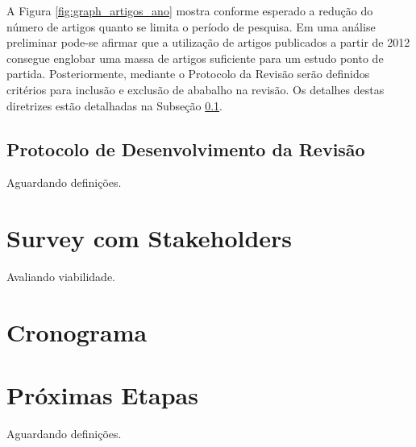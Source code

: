 \documentclass{article}
\begin{document}
A Figura \ref{fig:graph_artigos_ano} mostra conforme esperado a
redução do número de artigos quanto se limita o período de
pesquisa. Em uma análise preliminar pode-se afirmar que a utilização
de artigos publicados a partir de 2012 consegue englobar uma massa de
artigos suficiente para um estudo ponto de partida. Posteriormente,
mediante o Protocolo da Revisão serão definidos critérios para
inclusão e exclusão de ababalho na revisão. Os detalhes destas
diretrizes estão detalhadas na Subseção \ref{subsec:protocol}.



\subsection{Protocolo de Desenvolvimento da Revisão}
\label{subsec:protocol}

Aguardando definições.

\section{Survey com Stakeholders}
\label{sec:survey}

Avaliando viabilidade.

\section{Cronograma}
\label{sec:cronograma}


\section{Próximas Etapas}
\label{sec:proximas_etapas}

Aguardando definições.

\medskip


\end{document}
